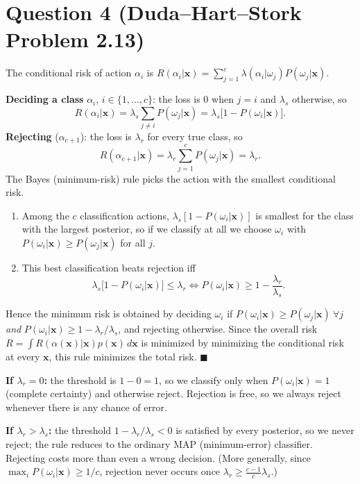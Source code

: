 \documentclass[11pt]{article}
\newcommand{\x}{\mathbf{x}}\newcommand{\z}{\mathbf{z}}\newcommand{\w}{\mathbf{w}}
\begin{document}
\section*{Question 4 (Duda--Hart--Stork Problem 2.13)}
The conditional risk of action $\alpha_i$ is $R(\alpha_i|\x)=\sum_{j=1}^c\lambda(\alpha_i|\omega_j)P(\omega_j|\x)$.

\textbf{Deciding a class} $\alpha_i$, $i\in\{1,\dots,c\}$: the loss is $0$ when $j=i$ and $\lambda_s$ otherwise, so
\[
R(\alpha_i|\x)=\lambda_s\sum_{j\ne i}P(\omega_j|\x)=\lambda_s\big[1-P(\omega_i|\x)\big].
\]
\textbf{Rejecting} ($\alpha_{c+1}$): the loss is $\lambda_r$ for every true class, so
\[
R(\alpha_{c+1}|\x)=\lambda_r\sum_{j=1}^cP(\omega_j|\x)=\lambda_r .
\]
The Bayes (minimum-risk) rule picks the action with the smallest conditional risk.
\begin{enumerate}
\item Among the $c$ classification actions, $\lambda_s[1-P(\omega_i|\x)]$ is smallest for the class with the largest posterior, so if we classify at all we choose $\omega_i$ with $P(\omega_i|\x)\ge P(\omega_j|\x)$ for all $j$.
\item This best classification beats rejection iff
\[
\lambda_s\big[1-P(\omega_i|\x)\big]\le\lambda_r\iff P(\omega_i|\x)\ge 1-\frac{\lambda_r}{\lambda_s}.
\]
\end{enumerate}
Hence the minimum risk is obtained by deciding $\omega_i$ if $P(\omega_i|\x)\ge P(\omega_j|\x)\ \forall j$ \emph{and} $P(\omega_i|\x)\ge1-\lambda_r/\lambda_s$, and rejecting otherwise. Since the overall risk $R=\int R(\alpha(\x)|\x)p(\x)\,d\x$ is minimized by minimizing the conditional risk at every $\x$, this rule minimizes the total risk. $\blacksquare$

\textbf{If $\lambda_r=0$:} the threshold is $1-0=1$, so we classify only when $P(\omega_i|\x)=1$ (complete certainty) and otherwise reject. Rejection is free, so we always reject whenever there is any chance of error.

\textbf{If $\lambda_r>\lambda_s$:} the threshold $1-\lambda_r/\lambda_s<0$ is satisfied by every posterior, so we never reject; the rule reduces to the ordinary MAP (minimum-error) classifier. Rejecting costs more than even a wrong decision. (More generally, since $\max_iP(\omega_i|\x)\ge1/c$, rejection never occurs once $\lambda_r\ge\frac{c-1}{c}\lambda_s$.)

\end{document}
